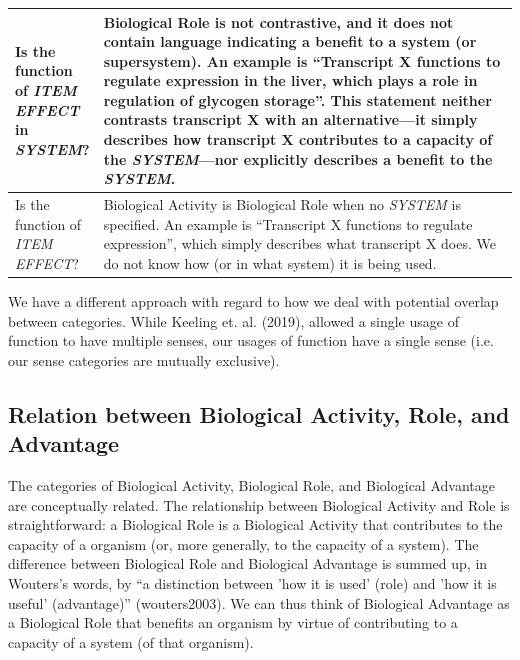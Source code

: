\documentclass{article}
\begin{document}
\begin{landscape}
\begin{table}
\begin{tabular}{|p{0.17\linewidth}|p{0.97\linewidth}|}
    \hline
    Is the function of \emph{ITEM} \emph{EFFECT} in \emph{SYSTEM}? &  Biological Role is not contrastive, and it does not contain language indicating a benefit to a system (or supersystem). An example is ``Transcript X functions to regulate expression in the liver, which plays a role in regulation of glycogen storage''. This statement neither contrasts transcript X with an alternative---it simply describes how transcript X contributes to a capacity of the \emph{SYSTEM}---nor explicitly describes a benefit to the \emph{SYSTEM}.  \\
    \hline
    Is the function of \emph{ITEM} \emph{EFFECT}? &  Biological Activity is Biological Role when no \emph{SYSTEM} is specified. An example is ``Transcript X functions to regulate expression'', which simply describes what transcript X does. We do not know how (or in what system) it is being used. \\
    \hline
  \end{tabular}
  \label{tab:flowchart}
\end{table}
\end{landscape}



We have a different approach with regard to how we deal with potential overlap between categories.
While Keeling et. al. (2019), allowed a single usage of function to have multiple senses, our usages of function have a single sense (i.e. our sense categories are mutually exclusive).


\subsection{Relation between Biological Activity, Role, and Advantage}
\label{sec:relat-betw-funct}

The categories of Biological Activity, Biological Role, and Biological Advantage are conceptually related.
The relationship between Biological Activity and Role is straightforward: a Biological Role is a Biological Activity that contributes to the capacity of a organism (or, more generally, to the capacity of a system). 
The difference between Biological Role and Biological Advantage is summed up, in Wouters's words, by ``a distinction between 'how it is used' (role) and 'how it is useful' (advantage)'' (wouters2003).
We can thus think of Biological Advantage as a Biological Role that benefits an organism by virtue of contributing to a capacity of a system (of that organism).
\end{document}
